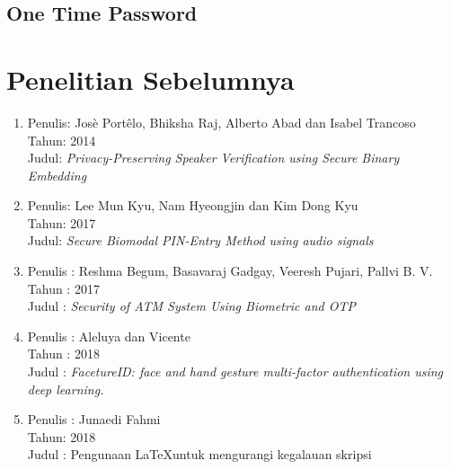 \subsection{One Time Password}


\newpage
\section{Penelitian Sebelumnya}
\begin{enumerate}
	
	\item Penulis: Jos\`{e} Port\^{e}lo, Bhiksha Raj, Alberto Abad dan Isabel Trancoso\\ 
	Tahun: 2014\\
	Judul: \textit{Privacy-Preserving Speaker Verification using Secure Binary Embedding}  \\
	\lipsum[1]
	
	\item Penulis: Lee Mun Kyu, Nam Hyeongjin dan Kim Dong Kyu\\
	Tahun: 2017\\
	Judul: \textit{Secure Biomodal PIN-Entry Method using audio signals}  \\
	\lipsum[2]
	
	\item Penulis : Reshma Begum, Basavaraj Gadgay, Veeresh Pujari, Pallvi B. V. \\
	Tahun : 2017 \\
	Judul : \textit{Security of ATM System Using Biometric and OTP}
	\lipsum[3]
	
	\item Penulis : Aleluya dan Vicente\\
	Tahun : 2018 \\
	Judul : \textit{FacetureID: face and hand gesture multi-factor authentication using deep learning.}\\
	\lipsum[4]
	
	\item Penulis : Junaedi Fahmi\\
	Tahun: 2018\\
	Judul : Pengunaan \LaTeX untuk mengurangi kegalauan skripsi\\
	\lipsum[5]
\end{enumerate}

